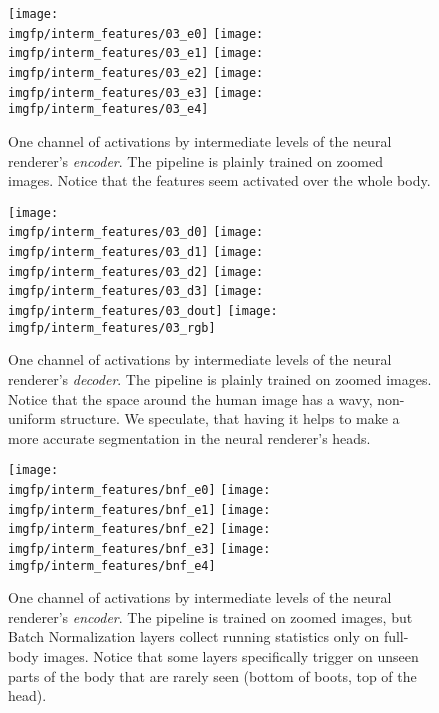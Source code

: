 \begin{figure}
	\centering
	\texttt{[image: \\imgfp/interm\_features/03\_e0]}%
	\hfill\texttt{[image: \\imgfp/interm\_features/03\_e1]}%
	\hfill\texttt{[image: \\imgfp/interm\_features/03\_e2]}%
	\hfill\texttt{[image: \\imgfp/interm\_features/03\_e3]}%
	\hfill\texttt{[image: \\imgfp/interm\_features/03\_e4]}%
	\caption{One channel of activations by intermediate levels of the neural renderer's \textit{encoder}. The pipeline is plainly trained on zoomed images. Notice that the features seem activated over the whole body.}
	\label{fig:interm03_encoder}
\end{figure}
\begin{figure}
	\centering
	\texttt{[image: \\imgfp/interm\_features/03\_d0]}%
	\hfill\texttt{[image: \\imgfp/interm\_features/03\_d1]}%
	\hfill\texttt{[image: \\imgfp/interm\_features/03\_d2]}%
	\hfill\texttt{[image: \\imgfp/interm\_features/03\_d3]}%
	\hfill\texttt{[image: \\imgfp/interm\_features/03\_dout]}%
	\hfill\texttt{[image: \\imgfp/interm\_features/03\_rgb]}
	\caption{One channel of activations by intermediate levels of the neural renderer's \textit{decoder}. The pipeline is plainly trained on zoomed images. Notice that the space around the human image has a wavy, non-uniform structure. We speculate, that having it helps to make a more accurate segmentation in the neural renderer's heads. }
	\label{fig:interm03_decoder}
\end{figure}
\begin{figure}
	\centering
	\texttt{[image: \\imgfp/interm\_features/bnf\_e0]}%
	\hfill\texttt{[image: \\imgfp/interm\_features/bnf\_e1]}%
	\hfill\texttt{[image: \\imgfp/interm\_features/bnf\_e2]}%
	\hfill\texttt{[image: \\imgfp/interm\_features/bnf\_e3]}%
	\hfill\texttt{[image: \\imgfp/interm\_features/bnf\_e4]}%
	\caption{One channel of activations by intermediate levels of the neural renderer's \textit{encoder}. The pipeline is trained on zoomed images, but Batch Normalization layers collect running statistics only on full-body images. Notice that some layers specifically trigger on unseen parts of the body that are rarely seen (bottom of boots, top of the head).}
	\label{fig:interm06_encoder}
\end{figure}
